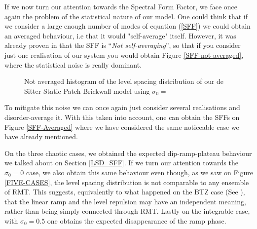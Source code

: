 \documentclass[11pt,a4paper]{article}
\begin{document}
{If we now turn our attention towards the Spectral Form Factor, we face once again the problem of the statistical nature of our model. One could think that if we consider a large enough number of modes of equation (\ref{SFF}) we could obtain an averaged behaviour, i.e that it would "self-average" itself. However, it was already proven in \cite{Prange_1997} that the SFF is \textquotedblleft\textit{Not self-averaging}\textquotedblright, so that if you consider just one realisation of our system you would obtain Figure \ref{SFF-not-averaged}, where the statistical noise is really dominant.

\begin{figure}[ht]
    \centering
        \caption{Not averaged histogram of the level spacing distribution of our de Sitter Static Patch Brickwall model using $\sigma_0=$}
\end{figure}

To mitigate this noise we can once again just consider several realisations and disorder-average it. With this taken into account, one can obtain the SFFs on Figure \ref{SFF-Averaged} where we have considered the same noticeable case we have already mentioned.

On the three chaotic cases, we obtained the expected dip-ramp-plateau behaviour we talked about on Section \ref{LSD_SFF}. If we turn our attention towards the $\sigma_0=0$ case, we also obtain this same behaviour even though, as we saw on Figure \ref{FIVE-CASES}, the level spacing distribution is not comparable to any ensemble of RMT. This suggests, equivalently to what happened on the BTZ case (See \cite{Jeong_2025}), that the linear ramp and the level repulsion may have an independent meaning, rather than being simply connected through RMT. Lastly on the integrable case, with $\sigma_0=0.5$ one obtains the expected disappearance of the ramp phase.

}
\end{document}
